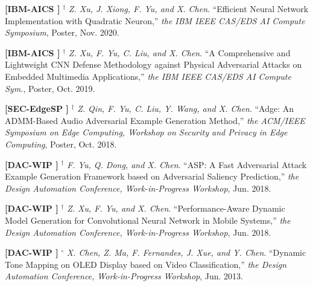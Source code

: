 	\textbf{[IBM-AICS ]}
	$^\dagger$
	\textsl{Z. Xu, J. Xiong, F. Yu, and X. Chen}.
		``Efficient Neural Network Implementation with Quadratic Neuron,''
		\textsl{the IBM IEEE CAS/EDS AI Compute Symposium}, Poster, Nov. 2020.
			\vspace{-3mm}

	\textbf{[IBM-AICS ]}
	$^\dagger$
	\textsl{Z. Xu, F. Yu, C. Liu, and X. Chen}.
		``A Comprehensive and Lightweight CNN Defense Methodology against Physical Adversarial Attacks on Embedded Multimedia Applications,''
		\textsl{the IBM IEEE CAS/EDS AI Compute Sym.}, Poster, Oct. 2019.
			\vspace{-3mm}

	\textbf{[SEC-EdgeSP ]}
	$^\dagger$
	\textsl{Z. Qin, F. Yu, C. Liu, Y. Wang, and X. Chen}.
		``Adge: An ADMM-Based Audio Adversarial Example Generation Method,''
		\textsl{the ACM/IEEE Symposium on Edge Computing, Workshop on Security and Privacy in Edge Computing}, Poster, Oct. 2018.
			\vspace{-3mm}

	\textbf{[DAC-WIP ]}
	$^\dagger$
	\textsl{F. Yu, Q. Dong, and X. Chen}.
		``ASP\@: A Fast Adversarial Attack Example Generation Framework based on Adversarial Saliency Prediction,''
		\textsl{the Design Automation Conference, Work-in-Progress Workshop}, Jun. 2018.
			\vspace{-3mm}

	\textbf{[DAC-WIP ]}
	$^\dagger$
	\textsl{Z. Xu, F. Yu, and X. Chen}.
		``Performance-Aware Dynamic Model Generation for Convolutional Neural Network in Mobile Systems,''
		\textsl{the Design Automation Conference, Work-in-Progress Workshop}, Jun. 2018.
			\vspace{-3mm}

	\textbf{[DAC-WIP ]}
	$^\circ$
	\textsl{X. Chen, Z. Ma, F. Fernandes, J. Xue, and Y. Chen}.
		``Dynamic Tone Mapping on OLED Display based on Video Classification,''
		\textsl{the Design Automation Conference, Work-in-Progress Workshop}, Jun. 2013.
			\vspace{-3mm}

